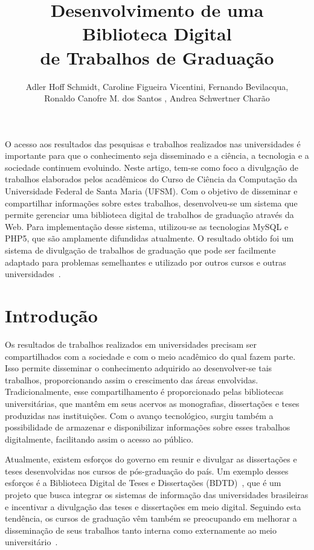 \documentclass[12pt]{article}
\title{Desenvolvimento de uma Biblioteca Digital\\ de Trabalhos de Gradua\c{c}\~{a}o}
\author{Adler Hoff Schmidt\inst{1}, Caroline Figueira Vicentini\inst{1}, Fernando Bevilacqua\inst{1}, \\Ronaldo Canofre M. dos Santos \inst{1}, Andrea Schwertner Char\~{a}o\inst{1} }
\begin{document}
\maketitle

     
\begin{resumo}
O acesso aos resultados das pesquisas e trabalhos realizados nas universidades \'{e} importante para que o conhecimento seja disseminado e a ci\^{e}ncia, a tecnologia e a sociedade continuem evoluindo. Neste artigo, tem-se como foco a divulga\c{c}\~{a}o de trabalhos elaborados pelos acad\^{e}micos do Curso de Ci\^{e}ncia da Computa\c{c}\~{a}o da Universidade Federal de Santa Maria (UFSM). Com o objetivo de disseminar e compartilhar informa\c{c}\~{o}es sobre estes trabalhos, desenvolveu-se um sistema que permite gerenciar uma biblioteca digital de trabalhos de gradua\c{c}\~{a}o atrav\'{e}s da Web. Para implementa\c{c}\~{a}o desse sistema, utilizou-se as tecnologias MySQL e PHP5, que s\~{a}o amplamente difundidas atualmente. O resultado obtido foi um sistema de divulga\c{c}\~{a}o de trabalhos de gradua\c{c}\~{a}o que pode ser facilmente adaptado para problemas semelhantes e utilizado por outros cursos e outras universidades~\nocite{sbc}.
\end{resumo}


\section{Introdu\c{c}\~{a}o}
Os resultados de trabalhos realizados em universidades precisam ser compartilhados com a sociedade e com o meio acad\^{e}mico do qual fazem parte. Isso permite disseminar o conhecimento adquirido ao desenvolver-se tais trabalhos, proporcionando assim o crescimento das \'{a}reas envolvidas. Tradicionalmente, esse compartilhamento \'{e} proporcionado pelas bibliotecas universit\'{a}rias, que mant\^{e}m em seus acervos as monografias, disserta\c{c}\~{o}es e teses produzidas nas institui\c{c}\~{o}es. Com o avan\c{c}o tecnol\'{o}gico, surgiu tamb\'{e}m a possibilidade de armazenar e disponibilizar informa\c{c}\~{o}es sobre esses trabalhos digitalmente, facilitando assim o acesso ao p\'{u}blico.

Atualmente, existem esfor\c{c}os do governo em reunir e divulgar as disserta\c{c}\~{o}es e teses desenvolvidas nos cursos de p\'{o}s-gradua\c{c}\~{a}o do pa\'{i}s. Um exemplo desses esfor\c{c}os \'{e} a Biblioteca Digital de Teses e Disserta\c{c}\~{o}es (BDTD)~\cite{bdtd}, que \'{e} um projeto que busca integrar os sistemas de informa\c{c}\~{a}o das universidades brasileiras e incentivar a divulga\c{c}\~{a}o das teses e disserta\c{c}\~{o}es em meio digital. Seguindo esta tend\^{e}ncia, os cursos de gradua\c{c}\~{a}o v\^{e}m tamb\'{e}m se preocupando em melhorar a dissemina\c{c}\~{a}o de seus trabalhos tanto interna como externamente ao meio universit\'{a}rio~\cite{avaliacao}.
\end{document}
